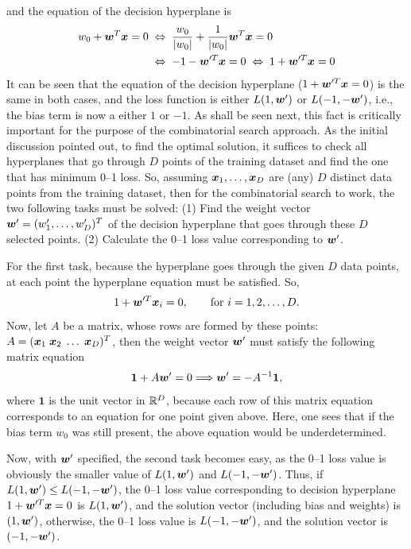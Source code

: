 and the equation of the decision hyperplane is 
\begin{align*}
w_0 + \boldsymbol{w}^T\boldsymbol{x} = 0 \; & \Leftrightarrow \; \frac{w_0}{|w_0|} + \frac{1}{|w_0|} \boldsymbol{w}^T \boldsymbol{x}  = 0 \\& \Leftrightarrow \; -1 - \boldsymbol{w}'^T \boldsymbol{x} = 0 \; \Leftrightarrow \; 1 + \boldsymbol{w}'^T \boldsymbol{x} = 0
\end{align*}
It can be seen that the equation of the decision hyperplane ($1 +
\boldsymbol{w}'^T \boldsymbol{x} = 0$) is the same in both cases, and the loss
function is either $L(1, \boldsymbol{w}')$ or $L(-1, -\boldsymbol{w}')$, i.e., the bias term
is now a either $1$ or $-1$. As shall be
seen next, this fact is critically important for the purpose of the
combinatorial search approach. As the initial discussion 
pointed out, to find the optimal solution, it suffices to
check all hyperplanes that go through $D$ points of the training
dataset and find the one that has minimum 0--1 loss. So, assuming
$\boldsymbol{x}_1, \dots, \boldsymbol{x}_D$ are (any) $D$ distinct
data points from the training dataset, then for the combinatorial
search to work, the two following tasks must be solved:
(1) Find the weight vector $\boldsymbol{w}'=(w'_1, \dots, w'_D)^T$ of the
  decision hyperplane that goes through these $D$ selected points.
(2) Calculate the 0--1 loss value corresponding to $\boldsymbol{w}'$.

For the first task, because the hyperplane goes through the given $D$
data points, at each point the hyperplane equation must be
satisfied. So,
$$ 1+ \boldsymbol{w}'^T\boldsymbol{x}_i = 0, \quad\quad \text{for } i = 1, 2, \dots, D.$$
Now, let $A$ be a matrix, whose rows are formed by these points: 
$A =(\boldsymbol{x}_1\; \boldsymbol{x}_2\; \dots \; \boldsymbol{x}_D)^T$,
then the weight vector $\boldsymbol{w}'$ must satisfy the following matrix equation 
\begin{equation}\label{eq:matrix}
\boldsymbol{1} + A \boldsymbol{w}' = 0 \Longrightarrow \boldsymbol{w}' = -A^{-1}\boldsymbol{1},
\end{equation}
where $\boldsymbol{1}$ is the unit vector in $\mathbb{R}^D$, because each row
of this matrix equation corresponds to an equation for one point given
above. Here, one sees that if the bias term $w_0$ was still present,
the above equation would be underdetermined.

Now, with $\boldsymbol{w}'$ specified, the second task becomes easy, as the 0--1
loss value is obviously the smaller value of $L(1,\boldsymbol{w}')$ and $L(-1,
-\boldsymbol{w}')$. Thus, if $L(1,\boldsymbol{w}') \leq L(-1,-\boldsymbol{w}')$, the 0--1 loss value
corresponding to decision hyperplane $1+\boldsymbol{w}'^T\boldsymbol{x} = 0$ is
$L(1,\boldsymbol{w}')$, and the solution vector (including bias and weights) is
$(1, \boldsymbol{w}')$, otherwise, the 0--1 loss value is $L(-1,-\boldsymbol{w}')$, and the
solution vector is $(-1,-\boldsymbol{w}')$.

